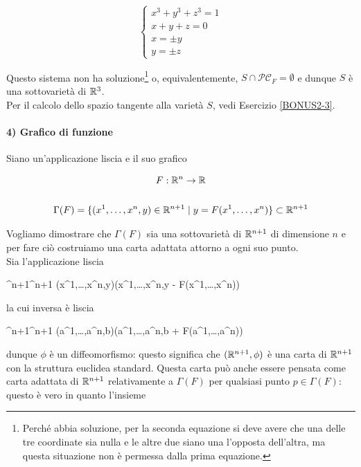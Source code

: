 \begin{equation}
	\begin{cases}
		x^{3} + y^{3} + z^{3} = 1\\
		x+y+z=0\\
		x = \pm y\\
		y = \pm z
	\end{cases}
\end{equation}

Questo sistema non ha soluzione\footnote{%
	Perché abbia soluzione, per la seconda equazione si deve avere che una delle tre coordinate sia nulla e le altre due siano una l'opposta dell'altra, ma questa situazione non è permessa dalla prima equazione.%
} o, equivalentemente, $ S \cap \mathcal{PC}_{F} = \emptyset $ e dunque $ S $ è una sottovarietà di $ \mathbb{R}^{3} $.\\
Per il calcolo dello spazio tangente alla varietà $ S $, vedi Esercizio \ref{BONUS2-3}.

\paragraph{4) Grafico di funzione}

Siano un'applicazione liscia e il suo grafico

\begin{gather}
	F : \mathbb{R}^{n} \to \mathbb{R}\\
	\nonumber \\
	\Gamma(F) = \{ (x^{1},\dots,x^{n},y) \in \mathbb{R}^{n+1} \mid y = F(x^{1},\dots,x^{n}) \} \subset \mathbb{R}^{n+1}
\end{gather}

Vogliamo dimostrare che $ \Gamma(F) $ sia una sottovarietà di $ \mathbb{R}^{n+1} $ di dimensione $ n $ e per fare ciò costruiamo una carta adattata attorno a ogni suo punto.\\
Sia l'applicazione liscia

\map{\phi}
	{\R^{n+1}}{\R^{n+1}}
	{(x^{1},\dots,x^{n},y)}{(x^{1},\dots,x^{n},y - F(x^{1},\dots,x^{n}))}

la cui inversa è liscia

	{\R^{n+1}}{\R^{n+1}}
	{(a^{1},\dots,a^{n},b)}{(a^{1},\dots,a^{n},b + F(a^{1},\dots,a^{n}))}

dunque $ \phi $ è un diffeomorfismo: questo significa che $ (\mathbb{R}^{n+1},\phi) $ è una carta di $ \mathbb{R}^{n+1} $ con la struttura euclidea standard. Questa carta può anche essere pensata come carta adattata di $ \mathbb{R}^{n+1} $ relativamente a $ \Gamma(F) $ per qualsiasi punto $ p \in \Gamma(F) $: questo è vero in quanto l'insieme

